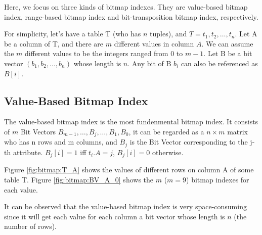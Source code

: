 \documentclass[12pt, a4paper]{article}
\begin{document}
Here, we focus on three kinds of bitmap indexes. They are value-based bitmap index, range-based bitmap index and bit-transposition bitmap index, respectively.

For simplicity, let's have a table T (who has $n$ tuples), and $T={t_1,t_2,\ldots,t_n}$. Let A be a column of T, and there are $m$ different values in column $A$. We can assume the $m$ different values to be the integers ranged from $0$ to $m-1$. Let B be a bit vector $(b_1, b_2, \ldots, b_n)$ whose length is $n$. Any bit of B $b_i$ can also be referenced as $B[i]$.

\subsection{Value-Based Bitmap Index}

The value-based bitmap index is the most fundenmental bitmap index. It consists of $m$ Bit Vectors ${B_{m-1}, \ldots, B_j, \ldots, B_1, B_0}$, it can be regarded as a $n \times m$ matrix who has n rows and m columns, and $B_j$ is the Bit Vector corresponding to the j-th attribute. $B_j[i]=1$ iff $t_i.A = j$, $B_j[i]=0$ otherwise.

Figure \ref{fig:bitmap:T_A} shows the values of different rows on column A of some table T. Figure \ref{fig:bitmap:BV_A_0} shows the $m$ ($m=9$) bitmap indexes for each value.

It can be observed that the value-based bitmap index is very space-consuming since it will get each value for each column a bit vector whose length is $n$ (the number of rows).
\end{document}
